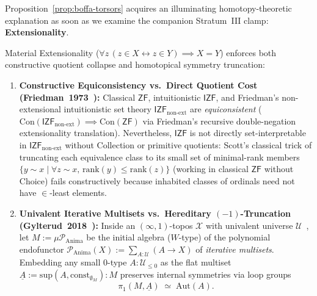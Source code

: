 Proposition~\ref{prop:boffa-torsors} acquires an illuminating homotopy-theoretic explanation as soon as we examine the companion Stratum~III clamp: \textbf{Extensionality}.

\begin{proposition}\label{prop:extensionality-truncation}%
%
\leanwitness%
%
Material Extensionality ($\forall z\,(z \in X \leftrightarrow z \in Y) \implies X = Y$) enforces both constructive quotient collapse and homotopical symmetry truncation:
\begin{enumerate}[label=\textup{(\roman*)},leftmargin=1.8em]
  \item \textbf{Constructive Equiconsistency vs.\ Direct Quotient Cost (Friedman~1973~\cite{Friedman73}):} Classical $\mathsf{ZF}$, intuitionistic $\mathsf{IZF}$, and Friedman's non-extensional intuitionistic set theory $\mathsf{IZF}_{\mathrm{non\text{-}ext}}$ are \emph{equiconsistent} ($\mathrm{Con}(\mathsf{IZF}_{\mathrm{non\text{-}ext}}) \implies \mathrm{Con}(\mathsf{ZF})$ via Friedman's recursive double-negation extensionality translation). Nevertheless, $\mathsf{IZF}$ is not directly set-interpretable in $\mathsf{IZF}_{\mathrm{non\text{-}ext}}$ without Collection or primitive quotients: Scott's classical trick of truncating each equivalence class to its small set of minimal-rank members $\{y \sim x \mid \forall z \sim x,\, \mathrm{rank}(y) \le \mathrm{rank}(z)\}$ (working in classical $\mathsf{ZF}$ without Choice) fails constructively because inhabited classes of ordinals need not have $\in$-least elements.
  \item \textbf{Univalent Iterative Multisets vs.\ Hereditary $(-1)$-Truncation (Gylterud~2018~\cite[Thm.~3.9]{Gylterud18}):} Inside an $(\infty, 1)$-topos $\mathcal{X}$ with univalent universe $\mathcal{U}$~\cite[\S 6.1.6]{Lurie09}, let $M := \mu \mathcal{P}_{\mathrm{Anima}}$ be the initial algebra ($W$-type) of the polynomial endofunctor $\mathcal{P}_{\mathrm{Anima}}(X) := \sum_{A : \mathcal{U}} (A \to X)$ of \emph{iterative multisets}. Embedding any small $0$-type $A : \mathcal{U}_{\le 0}$ as the flat multiset $\underline{A} := \mathrm{sup}(A, \mathrm{const}_{\emptyset_M}) : M$ preserves internal symmetries via loop groups
  \[
    \pi_1(M, \underline{A}) \;\simeq\; \mathrm{Aut}(A).
\]
\end{enumerate}
\end{proposition}

